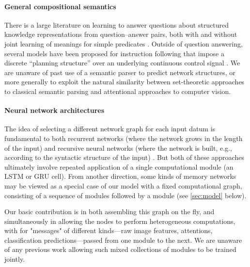 \paragraph{General compositional semantics}

There is a large literature on learning to answer questions about structured
knowledge representations from question--answer pairs, both with and without
joint learning of meanings for simple predicates \cite{Liang13DCS,Krish2013Grounded}.
Outside of question answering, several models have been proposed for instruction
following that impose a discrete ``planning structure'' over an underlying
continuous control signal \cite{Andreas14Paths,matuszek12icml}.  We are unaware
of past use of a semantic parser to predict network structures, or more
generally to exploit the natural similarity between set-theoretic approaches to
classical semantic parsing and attentional approaches to computer vision.

\paragraph{Neural network architectures}

The idea of selecting a different network graph for each input datum is
fundamental to both recurrent networks (where the network grows in the length of
the input) \cite{Elman90RNN} and recursive neural networks (where the network is
built, e.g., according to the syntactic structure of the input)
\cite{Socher13CVG}. But both of these approaches ultimately involve repeated
application of a single computational module (\eg an LSTM
\cite{Hochreiter97LSTM} or GRU \cite{Cho14GRU} cell).  From another direction,
some kinds of memory networks \cite{Weston14MemNet} may be viewed as a special
case of our model with a fixed computational graph, consisting of a sequence of
 modules followed by a  module (see
\autoref{sec:model} below).

Our basic contribution is in both assembling this graph on the fly, and
simultaneously in allowing the nodes to perform heterogeneous computations, with
for "messages" of different kinds---raw image features, attentions,
classification predictions---passed from one module to the next. We are unaware
of any previous work allowing such mixed collections of modules to be trained
jointly. 
